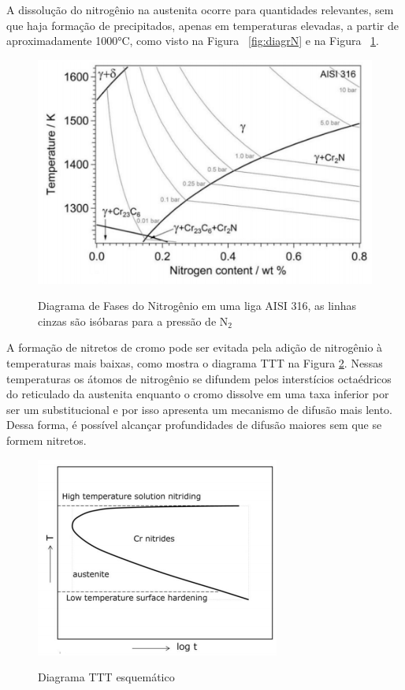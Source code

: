 \documentclass[]{politex}
\begin{document}
	A dissolução do nitrogênio na austenita ocorre para quantidades relevantes, sem que haja formação de precipitados, apenas em temperaturas elevadas, a partir de aproximadamente 1000°C, como visto na Figura ~\ref{fig:diagrN} e na Figura ~\ref{fig:diagramaN}.\par
	
	\begin{figure}[ht]
	\caption{Diagrama de Fases do Nitrogênio em uma liga AISI 316, as linhas cinzas são isóbaras para a pressão de N$_{2}$}
	\includegraphics{diagramaN}
	\label{fig:diagramaN}
	\centering
	\end{figure}
	
	A formação de nitretos de cromo pode ser evitada pela adição de nitrogênio à temperaturas mais baixas, como mostra o diagrama TTT na Figura \ref{fig:TTTN}. Nessas temperaturas os átomos de nitrogênio se difundem pelos interstícios octaédricos do reticulado da austenita enquanto o cromo dissolve em uma taxa inferior por ser um substitucional e por isso apresenta um mecanismo de difusão mais lento. Dessa forma, é possível alcançar profundidades de difusão maiores sem que se formem nitretos.\par

	\begin{figure}[ht]
	\caption{Diagrama TTT esquemático}
	\includegraphics{TTTN}
	\label{fig:TTTN}
	\centering
	\end{figure}
	
\end{document}
